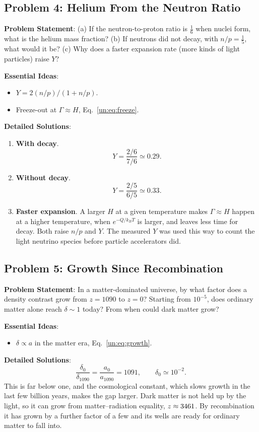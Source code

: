\subsection{Problem 4: Helium From the Neutron Ratio}
\label{un:prob:helium}

\textbf{Problem Statement}: (a) If the neutron-to-proton ratio is $\tfrac16$ when nuclei form, what is the helium mass fraction? (b) If neutrons did not decay, with $n/p=\tfrac15$, what would it be? (c) Why does a faster expansion rate (more kinds of light particles) raise $Y$?

\textbf{Essential Ideas}:
\begin{itemize}
	\item $Y=2(n/p)/(1+n/p)$.
	\item Freeze-out at $\Gamma\approx H$, Eq.~\eqref{un:eq:freeze}.
\end{itemize}

\textbf{Detailed Solutions}:
\begin{enumerate}[label=(\alph*)]
	\item \textbf{With decay}.
	\[
	\boxed{Y=\frac{2/6}{7/6}\simeq0.29.}
	\]
	\item \textbf{Without decay}.
	\[
	\boxed{Y=\frac{2/5}{6/5}\simeq0.33.}
	\]
	\item \textbf{Faster expansion}. A larger $H$ at a given temperature makes $\Gamma\approx H$ happen at a higher temperature, when $e^{-Q/k_BT}$ is larger, and leaves less time for decay. Both raise $n/p$ and $Y$. The measured $Y$ was used this way to count the light neutrino species before particle accelerators did.
\end{enumerate}

\subsection{Problem 5: Growth Since Recombination}
\label{un:prob:growth}

\textbf{Problem Statement}: In a matter-dominated universe, by what factor does a density contrast grow from $z=1090$ to $z=0$? Starting from $10^{-5}$, does ordinary matter alone reach $\delta\sim1$ today? From when could dark matter grow?

\textbf{Essential Ideas}:
\begin{itemize}
	\item $\delta\propto a$ in the matter era, Eq.~\eqref{un:eq:growth}.
\end{itemize}

\textbf{Detailed Solutions}:
\[
\boxed{\frac{\delta_0}{\delta_{1090}}=\frac{a_0}{a_{1090}}=1091,\qquad \delta_0\simeq10^{-2}.}
\]
This is far below one, and the cosmological constant, which slows growth in the last few billion years, makes the gap larger. Dark matter is not held up by the light, so it can grow from matter–radiation equality, $z\approx3461$. By recombination it has grown by a further factor of a few and its wells are ready for ordinary matter to fall into.
